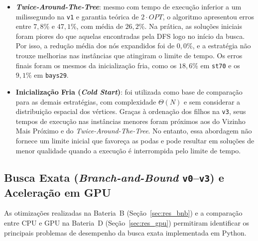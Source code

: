 \begin{itemize}
    \item \textbf{\textit{Twice-Around-The-Tree}}: mesmo com tempo de execução inferior a um milissegundo na \texttt{v1} e garantia teórica de $2 \cdot OPT$, o algoritmo apresentou erros entre $7{,}8\%$ e $47{,}1\%$, com média de $26{,}2\%$. Na prática, as soluções iniciais foram piores do que aquelas encontradas pela DFS logo no início da busca. Por isso, a redução média dos nós expandidos foi de $0{,}0\%$, e a estratégia não trouxe melhorias nas instâncias que atingiram o limite de tempo. Os erros finais foram os mesmos da inicialização fria, como os $18{,}6\%$ em \texttt{st70} e os $9{,}1\%$ em \texttt{bays29}.

    \item \textbf{Inicialização Fria (\textit{Cold Start})}: foi utilizada como base de comparação para as demais estratégias, com complexidade $\Theta(N)$ e sem considerar a distribuição espacial dos vértices. Graças à ordenação dos filhos na \texttt{v3}, seus tempos de execução nas instâncias menores foram próximos aos do Vizinho Mais Próximo e do \textit{Twice-Around-The-Tree}. No entanto, essa abordagem não fornece um limite inicial que favoreça as podas e pode resultar em soluções de menor qualidade quando a execução é interrompida pelo limite de tempo.
\end{itemize}


\subsection{Busca Exata (\textit{Branch-and-Bound} \texttt{v0}--\texttt{v3}) e Aceleração em GPU}
\label{sec:conc_bnb_gpu}

As otimizações realizadas na Bateria~B (Seção~\ref{sec:res_bnb}) e a comparação entre CPU e GPU na Bateria~D (Seção~\ref{sec:res_gpu}) permitiram identificar os principais problemas de desempenho da busca exata implementada em Python.

